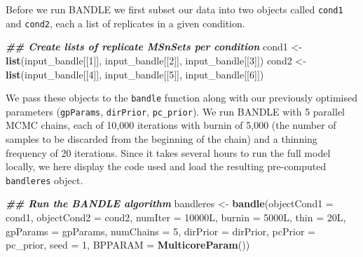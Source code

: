 \documentclass[9pt,a4paper,]{extarticle}
\newenvironment{Shaded}{\begin{snugshade}}{\end{snugshade}}
\newcommand{\AttributeTok}[1]{\textcolor[rgb]{0.13,0.29,0.53}{#1}}
\newcommand{\DataTypeTok}[1]{\textcolor[rgb]{0.13,0.29,0.53}{#1}}
\newcommand{\DecValTok}[1]{\textcolor[rgb]{0.00,0.00,0.81}{#1}}
\newcommand{\DocumentationTok}[1]{\textcolor[rgb]{0.56,0.35,0.01}{\textbf{\textit{#1}}}}
\newcommand{\FunctionTok}[1]{\textcolor[rgb]{0.13,0.29,0.53}{\textbf{#1}}}
\newcommand{\NormalTok}[1]{#1}
\newcommand{\OtherTok}[1]{\textcolor[rgb]{0.56,0.35,0.01}{#1}}
\begin{document}
Before we run BANDLE we first subset our data into two objects called \texttt{cond1}
and \texttt{cond2}, each a list of replicates in a given condition.

\begin{Shaded}
\begin{Highlighting}[]
\DocumentationTok{\#\# Create lists of replicate MSnSets per condition}
\NormalTok{cond1 }\OtherTok{\textless{}{-}} \FunctionTok{list}\NormalTok{(input\_bandle[[}\DecValTok{1}\NormalTok{]], input\_bandle[[}\DecValTok{2}\NormalTok{]], input\_bandle[[}\DecValTok{3}\NormalTok{]])}
\NormalTok{cond2 }\OtherTok{\textless{}{-}} \FunctionTok{list}\NormalTok{(input\_bandle[[}\DecValTok{4}\NormalTok{]], input\_bandle[[}\DecValTok{5}\NormalTok{]], input\_bandle[[}\DecValTok{6}\NormalTok{]])}
\end{Highlighting}
\end{Shaded}

We pass these objects to the \texttt{bandle} function along with our previously
optimised parameters (\texttt{gpParams}, \texttt{dirPrior}, \texttt{pc\_prior}). We run BANDLE
with 5 parallel MCMC chains, each of 10,000 iterations with burnin of 5,000
(the number of samples to be discarded from the beginning of the chain) and a
thinning frequency of 20 iterations. Since it takes several hours to run the full
model locally, we here display the code used and load the resulting pre-computed
\texttt{bandleres} object.

\begin{Shaded}
\begin{Highlighting}[]
\DocumentationTok{\#\# Run the BANDLE algorithm }
\NormalTok{bandleres }\OtherTok{\textless{}{-}} \FunctionTok{bandle}\NormalTok{(}\AttributeTok{objectCond1 =}\NormalTok{ cond1,}
                    \AttributeTok{objectCond2 =}\NormalTok{ cond2,}
                    \AttributeTok{numIter =} \DecValTok{10000}\DataTypeTok{L}\NormalTok{,}
                    \AttributeTok{burnin =} \DecValTok{5000}\DataTypeTok{L}\NormalTok{,}
                    \AttributeTok{thin =} \DecValTok{20}\DataTypeTok{L}\NormalTok{,}
                    \AttributeTok{gpParams =}\NormalTok{ gpParams,}
                    \AttributeTok{numChains =} \DecValTok{5}\NormalTok{,}
                    \AttributeTok{dirPrior =}\NormalTok{ dirPrior,}
                    \AttributeTok{pcPrior =}\NormalTok{ pc\_prior,}
                    \AttributeTok{seed =} \DecValTok{1}\NormalTok{,}
                    \AttributeTok{BPPARAM =} \FunctionTok{MulticoreParam}\NormalTok{())}
\end{Highlighting}
\end{Shaded}
\end{document}
